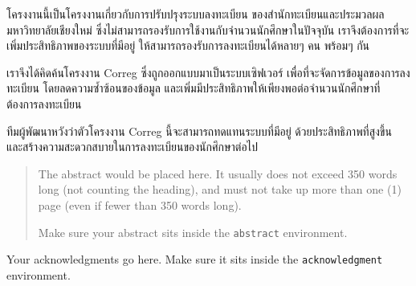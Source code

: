 \maketitle
\makesignature

\ifproject
\begin{abstractTH}

โครงงานนี้เป็นโครงงานเกี่ยวกับการปรับปรุงระบบลงทะเบียน ของสำนักทะเบียนและประมวลผล มหาวิทยาลัยเชียงใหม่ ซึ่งไม่สามารถรองรับการใช้งานกับจำนวนนักศึกษาในปัจจุบัน เราจึงต้องการที่จะเพิ่มประสิทธิภาพของระบบที่มีอยู่ ให้สามารถรองรับการลงทะเบียนได้หลายๆ คน พร้อมๆ กัน

เราจึงได้คิดค้นโครงงาน Correg ซึ่งถูกออกแบบมาเป็นระบบเซิฟเวอร์ เพื่อที่จะจัดการข้อมูลของการลงทะเบียน โดยลดความซ้ำซ้อนของข้อมูล และเพิ่มมีประสิทธิภาพให้เพียงพอต่อจำนวนนักศึกษาที่ต้องการลงทะเบียน

ทีมผู้พัฒนาหวังว่าตัวโครงงาน Correg นี้จะสามารถทดแทนระบบที่มีอยู่ ด้วยประสิทธิภาพที่สูงขึ้น และสร้างความสะดวกสบายในการลงทะเบียนของนักศึกษาต่อไป
\end{abstractTH}

\begin{abstract}
The abstract would be placed here. It usually does not exceed 350 words
long (not counting the heading), and must not take up more than one (1) page
(even if fewer than 350 words long).

Make sure your abstract sits inside the \texttt{abstract} environment.
\end{abstract}

\iffalse
\begin{dedication}
This document is dedicated to all Chiang Mai University students.

Dedication page is optional.
\end{dedication}
\fi %

\begin{acknowledgments}
Your acknowledgments go here. Make sure it sits inside the
\texttt{acknowledgment} environment.

\end{acknowledgments}%
\fi %

\contentspage

\ifproject
\figurelistpage

\tablelistpage
\fi %



